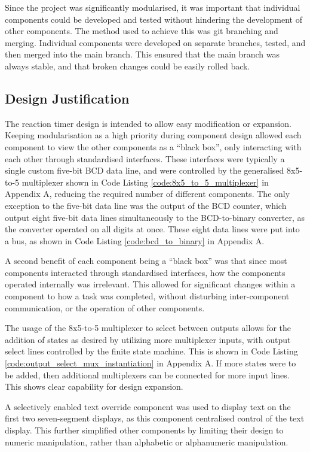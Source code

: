 \documentclass[11pt]{article}
\begin{document}
Since the project was significantly modularised, it was important that individual components could be developed and tested without hindering the development of other components. The method used to achieve this was git branching and merging. Individual components were developed on separate branches, tested, and then merged into the main branch. This ensured that the main branch was always stable, and that broken changes could be easily rolled back.

\subsection{Design Justification}

The reaction timer design is intended to allow easy modification or expansion. Keeping modularisation as a high priority during component design allowed each component to view the other components as a ``black box'', only interacting with each other through standardised interfaces. These interfaces were typically a single custom five-bit BCD data line, and were controlled by the generalised 8x5-to-5 multiplexer shown in Code Listing \ref{code:8x5_to_5_multiplexer} in Appendix A, reducing the required number of different components. The only exception to the five-bit data line was the output of the BCD counter, which output eight five-bit data lines simultaneously to the BCD-to-binary converter, as the converter operated on all digits at once. These eight data lines were put into a bus, as shown in Code Listing \ref{code:bcd_to_binary} in Appendix A.

A second benefit of each component being a ``black box'' was that since most components interacted through standardised interfaces, how the components operated internally was irrelevant. This allowed for significant changes within a component to how a task was completed, without disturbing inter-component communication, or the operation of other components.

The usage of the 8x5-to-5 multiplexer to select between outputs allows for the addition of states as desired by utilizing more multiplexer inputs, with output select lines controlled by the finite state machine. This is shown in Code Listing \ref{code:output_select_mux_instantiation} in Appendix A. If more states were to be added, then additional multiplexers can be connected for more input lines. This shows clear capability for design expansion.

A selectively enabled text override component was used to display text on the first two seven-segment displays, as this component centralised control of the text display. This further simplified other components by limiting their design to numeric manipulation, rather than alphabetic or alphanumeric manipulation.
\end{document}
